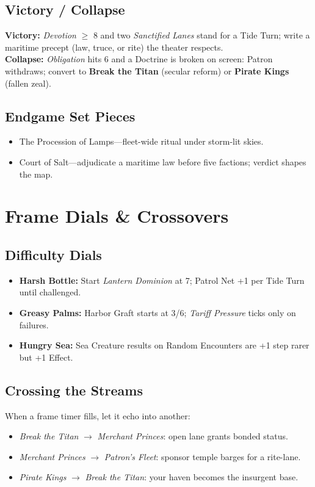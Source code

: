 \documentclass[11pt,oneside]{book}
\begin{document}
\begin{itemize}
\subsection*{Victory / Collapse}
\textbf{Victory:} \emph{Devotion} \(\geq\) 8 and two \emph{Sanctified Lanes} stand for a Tide Turn; write a maritime precept (law, truce, or rite) the theater respects.\\
\textbf{Collapse:} \emph{Obligation} hits 6 and a Doctrine is broken on screen: Patron withdraws; convert to \textbf{Break the Titan} (secular reform) or \textbf{Pirate Kings} (fallen zeal).

\subsection*{Endgame Set Pieces}
\begin{itemize}[leftmargin=*,itemsep=2pt]
  \item The Procession of Lamps---fleet-wide ritual under storm-lit skies.
  \item Court of Salt---adjudicate a maritime law before five factions; verdict shapes the map.
\end{itemize}

\section{Frame Dials \& Crossovers}

\subsection*{Difficulty Dials}
\begin{itemize}[leftmargin=*,itemsep=2pt]
  \item \textbf{Harsh Bottle:} Start \emph{Lantern Dominion} at 7; Patrol Net +1 per Tide Turn until challenged.
  \item \textbf{Greasy Palms:} Harbor Graft starts at 3/6; \emph{Tariff Pressure} ticks only on failures.
  \item \textbf{Hungry Sea:} Sea Creature results on Random Encounters are +1 step rarer but +1 Effect.
\end{itemize}

\subsection*{Crossing the Streams}
When a frame timer fills, let it echo into another:
\begin{itemize}[leftmargin=*,itemsep=2pt]
  \item \emph{Break the Titan} \(\to\) \emph{Merchant Princes}: open lane grants bonded status.
  \item \emph{Merchant Princes} \(\to\) \emph{Patron's Fleet}: sponsor temple barges for a rite-lane.
  \item \emph{Pirate Kings} \(\to\) \emph{Break the Titan}: your haven becomes the insurgent base.
\end{itemize}


\end{itemize}
\end{document}
